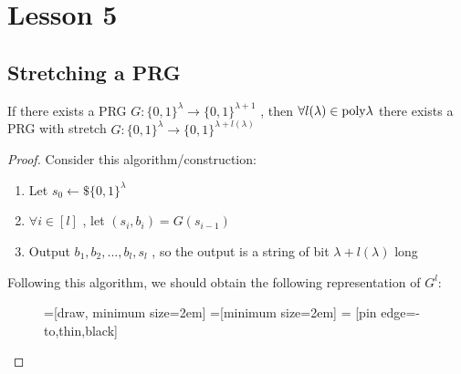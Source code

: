 \chapter*{Lesson 5}

\section{Stretching a PRG}
\begin{theorem}
    If there exists a PRG $G:\{0,1\}^{\lambda} \to \{0,1\}^{\lambda + 1}$ , then $ \forall l(\lambda) \in \mathrm{poly}{\lambda} $ there exists a PRG with stretch $G:\{0,1\}^{\lambda} \to \{0,1\}^{\lambda + l(\lambda)}$ 
\end{theorem}

\begin{proof}
    Consider this algorithm/construction:
    \begin{enumerate}
        \item Let $s_{0} \leftarrow\$ \{ 0,1\}^{\lambda}$
        \item $ \forall i \in [l] $ , let $(s_{i}, b_{i}) = G(s_{i-1})$
        \item Output $b_{1}, b_{2}, ..., b_{l}, s_{l}$ , so the output is a
            string of bit $\lambda + l(\lambda)$ long
    \end{enumerate}

    Following this algorithm, we should obtain the following representation of $G^{l}$:
    \begin{figure}[h!]
        =[draw, minimum size=2em]
        =[minimum size=2em]
         = [pin edge={-to,thin,black}]

\end{figure}
\end{proof}

